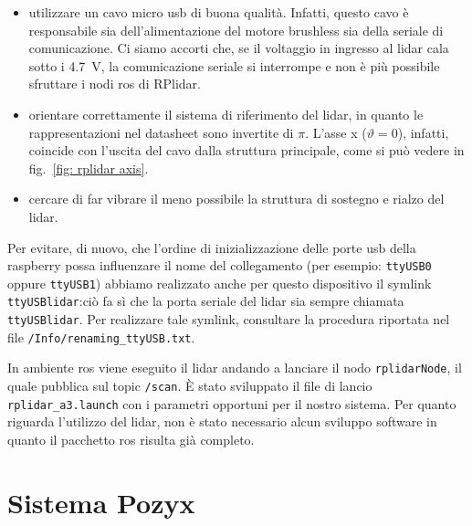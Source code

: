 \begin{itemize}
	\item utilizzare un cavo micro usb di buona qualità. Infatti, questo cavo è responsabile sia dell'alimentazione del motore brushless sia della seriale di 
	comunicazione. Ci siamo accorti che, se il voltaggio in ingresso al lidar cala sotto i \SI{4.7}{\volt}, la comunicazione seriale si interrompe e non è più possibile 
	sfruttare i nodi ros di RPlidar.

	\item orientare correttamente il sistema di riferimento del lidar, in quanto le rappresentazioni nel datasheet sono invertite di $\pi$. 
	L'asse x ($\vartheta = 0$), infatti, coincide con l'uscita del cavo dalla struttura principale, come si può vedere in fig.~\ref{fig: rplidar axis}.

	\item cercare di far vibrare il meno possibile la struttura di sostegno e rialzo del lidar.

\end{itemize}

Per evitare, di nuovo, che l'ordine di inizializzazione delle porte usb della raspberry possa influenzare il nome del collegamento (per esempio: 
\texttt{ttyUSB0} oppure \texttt{ttyUSB1}) abbiamo realizzato anche per questo dispositivo il symlink \texttt{ttyUSBlidar}:ciò fa sì che la porta seriale 
del lidar sia sempre chiamata \texttt{ttyUSBlidar}. 
Per realizzare tale symlink, consultare la procedura riportata nel file \texttt{/Info/renaming\_ttyUSB.txt}.

In ambiente ros viene eseguito il lidar andando a lanciare il nodo \texttt{rplidarNode}, il quale pubblica sul topic \texttt{/scan}. 
\`E stato sviluppato il file di lancio \texttt{rplidar\_a3.launch} con i parametri opportuni per il nostro sistema.  
Per quanto riguarda l'utilizzo del lidar, non è stato necessario alcun sviluppo software in quanto il pacchetto ros risulta già completo.


\newpage
\section{Sistema Pozyx}
\label{sez:Sistema Pozyx}

